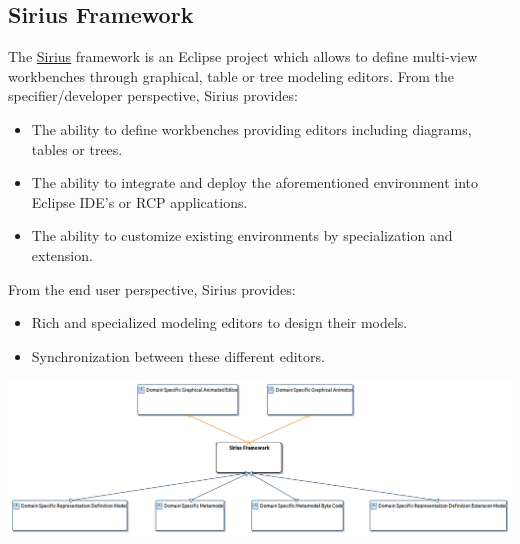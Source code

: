 \documentclass{gemoc} %
\begin{document}
\subsection{Sirius Framework}
\label{sec:Sirius_Framework}

The \href{http://www.eclipse.org/proposals/modeling.sirius/}{Sirius} framework is an Eclipse project which allows to define multi-view workbenches through graphical, table or tree modeling editors.
From the specifier/developer perspective, Sirius provides:
\begin{itemize}
\item The ability to define workbenches providing editors including diagrams, tables or trees.
\item The ability to integrate and deploy the aforementioned environment into Eclipse IDE's or RCP applications.
\item The ability to customize existing environments by specialization and extension.
\end{itemize}
From the end user perspective, Sirius provides:
\begin{itemize}
\item Rich and specialized modeling editors to design their models.
\item Synchronization between these different editors.
\end{itemize}
\begin{center}
\includegraphics*[trim=0.0cm 0.0cm 0cm 0.0cm, clip=true]{../images/generated/Generated_Sirius_Framework.png}
\end{center}
\end{document}
